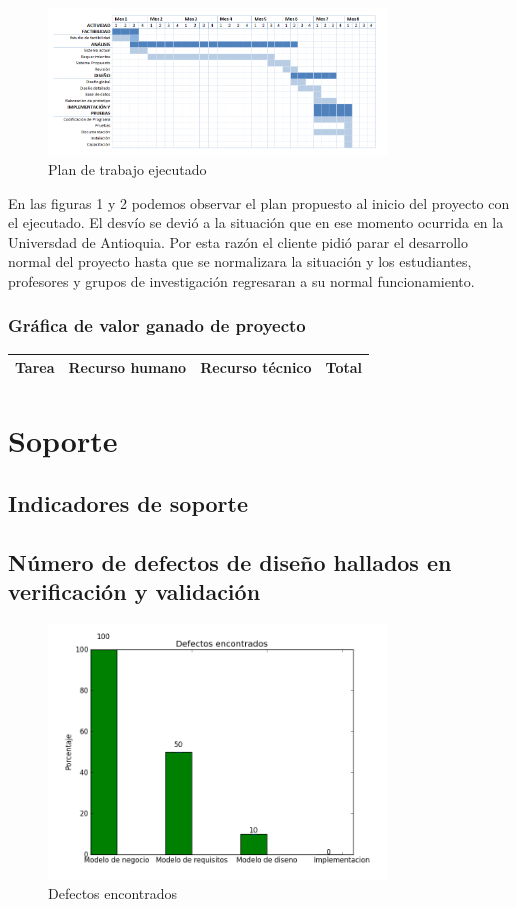\documentclass[a4paper,10pt]{article}
\begin{document}
\begin{figure}[h!]
  \centering
      \includegraphics[width=0.80\textwidth]{./img/cal2.png}
  \caption{Plan de trabajo ejecutado}
\end{figure}

\maketitle En las figuras 1 y 2 podemos observar el plan propuesto al inicio del proyecto con el ejecutado. El desvío se devió a la situación que en ese momento ocurrida en la Universdad de Antioquia. Por esta razón el cliente pidió parar el desarrollo normal del proyecto hasta que se normalizara la situación y los estudiantes, profesores y grupos de investigación regresaran a su normal funcionamiento.

\subsubsection{Gráfica de valor ganado de proyecto}

\begin{center}
\begin{tabular}{| c | c | c | c |}
\hline
Tarea & Recurso humano & Recurso técnico & Total \\
\hline

\hline
\end{tabular}
\end{center}

\section{Soporte}
\subsection{Indicadores de soporte}
\subsection{Número de defectos de diseño hallados en verificación y validación}

\begin{figure}[h!]
  \centering
    \includegraphics[width=0.80\textwidth]{./img/barras/barras.png}
  \caption{Defectos encontrados}
\end{figure}
\end{document}
